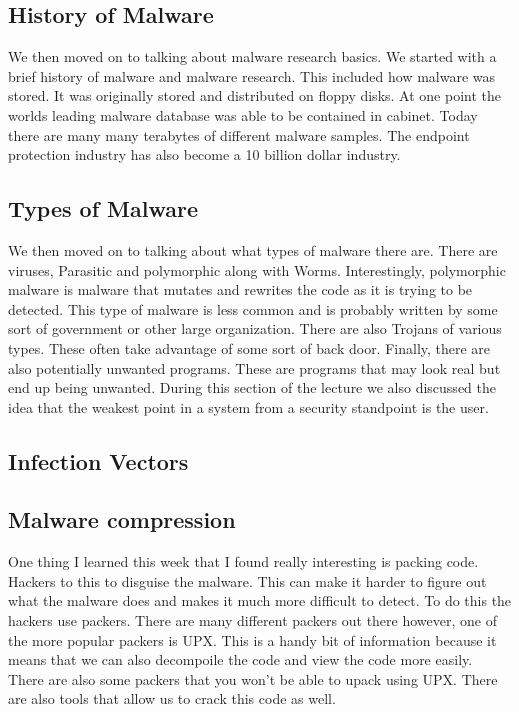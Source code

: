\documentclass[letterpaper, onecolumn,10pt]{IEEEtran}
\begin{document}
		    \subsection{History of Malware} We then moved on to talking about malware research basics. We started with a brief history of malware and malware research. This included how malware was stored. It was originally stored and distributed on floppy disks. At one point the worlds leading malware database was able to be contained in cabinet. Today there are many many terabytes of different malware samples. The endpoint protection industry has also become a 10 billion dollar industry.\\
		    
		    \subsection{Types of Malware} We then moved on to talking about what types of malware there are. There are viruses, Parasitic and polymorphic along with Worms. Interestingly, polymorphic malware is malware that mutates and rewrites the code as it is trying to be detected. This type of malware is less common and is probably written by some sort of government or other large organization. There are also Trojans of various types. These often take advantage of some sort of back door. Finally, there are also potentially unwanted programs. These are programs that may look real but end up being unwanted. During this section of the lecture we also discussed the idea that the weakest point in a system from a security standpoint is the user.\\
		    
		    \subsection{Infection Vectors}
		    
		    \subsection{Malware compression} One thing I learned this week that I found really interesting is packing code. Hackers to this to disguise the malware. This can make it harder to figure out what the malware does and makes it much more difficult to detect. To do this the hackers use packers. There are many different packers out there however, one of the more popular packers is UPX. This is a handy bit of information because it means that we can also decompoile the code and view the code more easily. There are also some packers that you won't be able to upack using UPX. There are also tools that allow us to crack this code as well.\\
		
\end{document}
